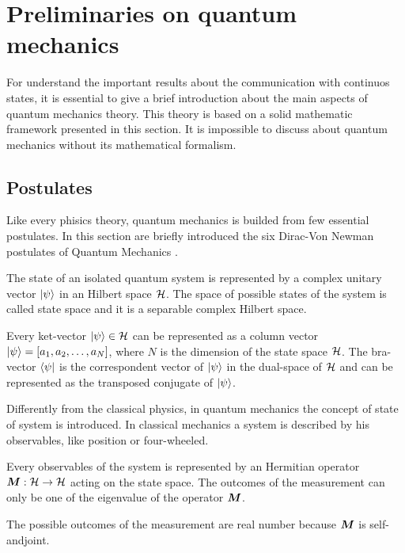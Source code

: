 \section{Preliminaries on quantum mechanics}
    For understand the important results about the communication with continuos
    states, it is essential to give a brief introduction about the main aspects 
    of quantum mechanics theory.
    This theory is based on a solid mathematic framework presented in this section.
    It is impossible to discuss about quantum mechanics without its mathematical 
    formalism.
    
    \subsection{Postulates}
    Like every phisics theory, quantum mechanics is builded from few 
    essential postulates.
    In this section are briefly introduced the six Dirac-Von Newman 
    postulates of Quantum Mechanics \cite{quantumMec_Dirac,quantumMec_Neumann}.

    \begin{postulate}
        The state of an isolated quantum system is represented by a complex unitary 
        vector $\ket{\psi}$ in an Hilbert space $\mathcal{H}$.
        The space of possible states of the system is called state space and it is a
        separable complex Hilbert space.
        \label{post:1}
    \end{postulate}
    Every ket-vector $\ket{\psi} \in \mathcal{H}$ can be represented as a column vector 
    $\ket{\psi}=\left[ a_1,a_2,\dots,a_N \right]$, where $N$ is the dimension of the 
    state space $\mathcal{H}$. The bra-vector $\bra{\psi}$ is the correspondent vector of
    $\ket{\psi}$ in the dual-space of $\mathcal{H}$ and can be represented as the 
    transposed conjugate of $\ket{\psi}$.

    Differently from the classical physics, in quantum mechanics the concept
    of state of system is introduced. In classical mechanics a system is 
    described by his observables, like position or four-wheeled.
    
    \begin{postulate}[Observables]
        Every observables of the system is represented by an Hermitian operator 
        $\Operator{M}:\Hilbert\to\Hilbert$ acting on the state space.
        The outcomes of the measurement can only be one of the eigenvalue of the 
        operator $\Operator{M}$.
        \label{post:2}
    \end{postulate}
    The possible outcomes of the measurement are real number because $\Operator{M}$
    is self-andjoint. 

